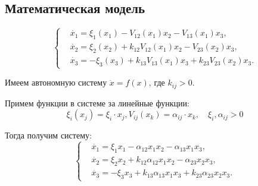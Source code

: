  \subsection{Математическая модель}
    \[
        \left\{\begin{split}
            & \dot{x_1} = \xi_1(x_1) - V_{12}(x_1)x_2 - V_{13}(x_1)x_3, \\
            & \dot{x_2} = \xi_2(x_2) + k_{12} V_{12}(x_1)x_2 - V_{23}(x_2)x_3, \\
            & \dot{x_3} = -\xi_3(x_3) + k_{13} V_{13}(x_1)x_3 + k_{23} V_{23}(x_2)x_3. 
        \end{split}\right.
    \]
    
    Имеем автономную систему \( \dot{x} = f(x) \), где \( k_{ij} > 0 \).

    Примем функции в системе за линейные функции: 
    \[ \xi_i(x_j) = \xi_i \cdot x_j, V_{ij}(x_k) = \alpha_{ij} \cdot x_k, \quad \xi_i, \alpha_{ij} > 0 \]

    Тогда получим систему:
    \[
        \left\{\begin{split}
            & \dot{x_1} = \xi_1 x_1 - \alpha_{12} x_1 x_2 - \alpha_{13} x_1 x_3, \\
            & \dot{x_2} = \xi_2 x_2 + k_{12} \alpha_{12} x_1 x_2 - \alpha_{23} x_2 x_3, \\
            & \dot{x_3} = -\xi_3 x_3 + k_{13} \alpha_{13} x_1 x_3 + k_{23} \alpha_{23} x_2 x_3. 
        \end{split}\right.
    \]